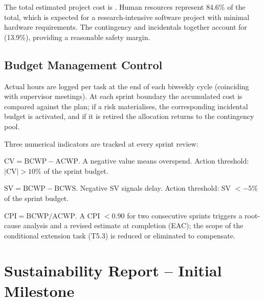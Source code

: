 \documentclass[11pt, a4paper]{article}
\begin{document}
The total estimated project cost is \textbf{}. Human resources represent 84.6\% of the total, which is expected for a research-intensive software project with minimal hardware requirements. The contingency and incidentals together account for  (13.9\%), providing a reasonable safety margin.

\subsection{Budget Management Control}
\label{sec:control}

Actual hours are logged per task at the end of each biweekly cycle (coinciding with supervisor meetings). At each sprint boundary the accumulated cost is compared against the plan; if a risk materialises, the corresponding incidental budget is activated, and if it is retired the allocation returns to the contingency pool.

Three numerical indicators are tracked at every sprint review:

\begin{description}[style=nextline, leftmargin=1.5cm]
    \item[Cost Variance (CV)]
    $\text{CV} = \text{BCWP} - \text{ACWP}$.
    A negative value means overspend. Action threshold: $|\text{CV}| > 10\%$ of the sprint budget.

    \item[Schedule Variance (SV)]
    $\text{SV} = \text{BCWP} - \text{BCWS}$.
    Negative SV signals delay. Action threshold: SV $< -5\%$ of the sprint budget.

    \item[Cost Performance Index (CPI)]
    $\text{CPI} = \text{BCWP} / \text{ACWP}$.
    A CPI $< 0.90$ for two consecutive sprints triggers a root-cause analysis and a revised estimate at completion (EAC); the scope of the conditional extension task (T5.3) is reduced or eliminated to compensate.
\end{description}

\section{Sustainability Report -- Initial Milestone}
\label{sec:sustainability}

\end{document}
